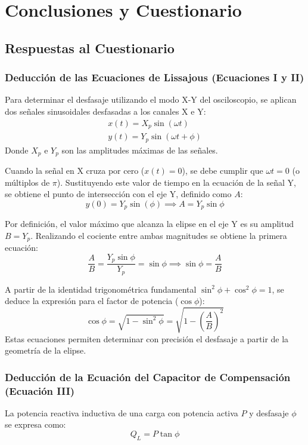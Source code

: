 \chapter{Conclusiones y Cuestionario}

\section{Respuestas al Cuestionario}

\subsection{Deducción de las Ecuaciones de Lissajous (Ecuaciones I y II)}
Para determinar el desfasaje utilizando el modo X-Y del osciloscopio, se aplican dos señales sinusoidales desfasadas
a los canales X e Y:
\begin{gather}
    x(t) = X_p \sin(\omega t) \\
    y(t) = Y_p \sin(\omega t + \phi)
\end{gather}
Donde $X_p$ e $Y_p$ son las amplitudes máximas de las señales.

Cuando la señal en X cruza por cero ($x(t) = 0$), se debe cumplir que $\omega t = 0$ (o múltiplos de $\pi$). Sustituyendo
este valor de tiempo en la ecuación de la señal Y, se obtiene el punto de intersección con el eje Y, definido
como $A$:
\begin{equation}
    y(0) = Y_p \sin(\phi) \implies A = Y_p \sin\phi
\end{equation}

Por definición, el valor máximo que alcanza la elipse en el eje Y es su amplitud $B = Y_p$. Realizando el cociente
entre ambas magnitudes se obtiene la primera ecuación:
\begin{equation}
    \frac{A}{B} = \frac{Y_p \sin\phi}{Y_p} = \sin\phi \implies \sin\phi = \frac{A}{B}
\end{equation}

A partir de la identidad trigonométrica fundamental $\sin^2\phi + \cos^2\phi = 1$, se deduce la expresión para
el factor de potencia ($\cos\phi$):
\begin{equation}
    \cos\phi = \sqrt{1 - \sin^2\phi} = \sqrt{1 - \left(\frac{A}{B}\right)^2}
\end{equation}
Estas ecuaciones permiten determinar con precisión el desfasaje a partir de la geometría de la elipse.


\subsection{Deducción de la Ecuación del Capacitor de Compensación (Ecuación III)}
La potencia reactiva inductiva de una carga con potencia activa $P$ y desfasaje $\phi$ se expresa como:
\begin{equation}
    Q_L = P \tan\phi
\end{equation}

